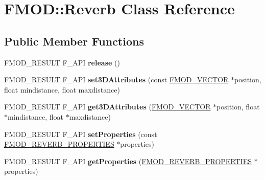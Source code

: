 \hypertarget{class_f_m_o_d_1_1_reverb}{\section{F\-M\-O\-D\-:\-:Reverb Class Reference}
\label{class_f_m_o_d_1_1_reverb}
}
\subsection*{Public Member Functions}
\begin{DoxyCompactItemize}
\item 
\hypertarget{class_f_m_o_d_1_1_reverb_affc0f1977a5a5189f3aa2f70ae884aa7}{F\-M\-O\-D\-\_\-\-R\-E\-S\-U\-L\-T F\-\_\-\-A\-P\-I {\bfseries release} ()}\label{class_f_m_o_d_1_1_reverb_affc0f1977a5a5189f3aa2f70ae884aa7}

\item 
\hypertarget{class_f_m_o_d_1_1_reverb_af1ada1ea4d3f32e28d462ab5ccf06314}{F\-M\-O\-D\-\_\-\-R\-E\-S\-U\-L\-T F\-\_\-\-A\-P\-I {\bfseries set3\-D\-Attributes} (const \hyperlink{struct_f_m_o_d___v_e_c_t_o_r}{F\-M\-O\-D\-\_\-\-V\-E\-C\-T\-O\-R} $\ast$position, float mindistance, float maxdistance)}\label{class_f_m_o_d_1_1_reverb_af1ada1ea4d3f32e28d462ab5ccf06314}

\item 
\hypertarget{class_f_m_o_d_1_1_reverb_aa5d6fae46d291616cf583e68410390dc}{F\-M\-O\-D\-\_\-\-R\-E\-S\-U\-L\-T F\-\_\-\-A\-P\-I {\bfseries get3\-D\-Attributes} (\hyperlink{struct_f_m_o_d___v_e_c_t_o_r}{F\-M\-O\-D\-\_\-\-V\-E\-C\-T\-O\-R} $\ast$position, float $\ast$mindistance, float $\ast$maxdistance)}\label{class_f_m_o_d_1_1_reverb_aa5d6fae46d291616cf583e68410390dc}

\item 
\hypertarget{class_f_m_o_d_1_1_reverb_a8b247009376148800cd70b444e702179}{F\-M\-O\-D\-\_\-\-R\-E\-S\-U\-L\-T F\-\_\-\-A\-P\-I {\bfseries set\-Properties} (const \hyperlink{struct_f_m_o_d___r_e_v_e_r_b___p_r_o_p_e_r_t_i_e_s}{F\-M\-O\-D\-\_\-\-R\-E\-V\-E\-R\-B\-\_\-\-P\-R\-O\-P\-E\-R\-T\-I\-E\-S} $\ast$properties)}\label{class_f_m_o_d_1_1_reverb_a8b247009376148800cd70b444e702179}

\item 
\hypertarget{class_f_m_o_d_1_1_reverb_a70d4d392767ba5aca142232a89fc1a5c}{F\-M\-O\-D\-\_\-\-R\-E\-S\-U\-L\-T F\-\_\-\-A\-P\-I {\bfseries get\-Properties} (\hyperlink{struct_f_m_o_d___r_e_v_e_r_b___p_r_o_p_e_r_t_i_e_s}{F\-M\-O\-D\-\_\-\-R\-E\-V\-E\-R\-B\-\_\-\-P\-R\-O\-P\-E\-R\-T\-I\-E\-S} $\ast$properties)}\label{class_f_m_o_d_1_1_reverb_a70d4d392767ba5aca142232a89fc1a5c}


\end{DoxyCompactItemize}
